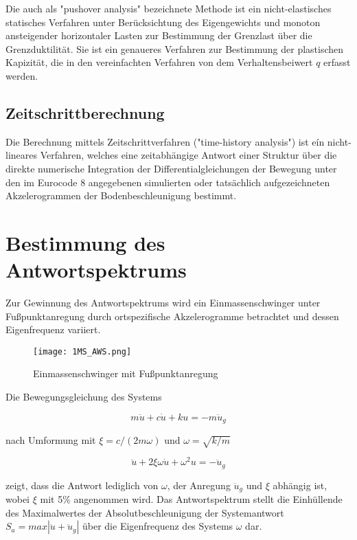 Die auch als "pushover analysis" bezeichnete Methode ist ein nicht-elastisches statisches Verfahren unter Berücksichtung des Eigengewichts und monoton ansteigender horizontaler Lasten zur Bestimmung der Grenzlast über die Grenzduktilität.
Sie ist ein genaueres Verfahren zur Bestimmung der plastischen Kapizität, die in den vereinfachten Verfahren von dem Verhaltensbeiwert $q$ erfasst werden.

\subsection{Zeitschrittberechnung}
\label{sec:Zeitschrittberechnung}

Die Berechnung mittels Zeitschrittverfahren ("time-history analysis") ist eín nicht-lineares Verfahren, welches eine zeitabhängige Antwort einer Struktur über die direkte numerische Integration der Differentialgleichungen der Bewegung unter den im Eurocode 8 angegebenen simulierten oder tatsächlich aufgezeichneten Akzelerogrammen der Bodenbeschleunigung bestimmt. 

\pagebreak

\section{Bestimmung des Antwortspektrums}
\label{sec:Antwortspektren}

Zur Gewinnung des Antwortspektrums wird ein Einmassenschwinger unter Fußpunktanregung durch ortspezifische Akzelerogramme betrachtet und dessen Eigenfrequenz variiert.

\begin{figure}[H]
    \centering
    \texttt{[image: 1MS\_AWS.png]}
    \caption{Einmassenschwinger mit Fußpunktanregung}
\end{figure}

Die Bewegungsgleichung des Systems

\begin{equation} \label{ems_aws}
m \ddot u + c \dot u + k u = -m \ddot u_g
\end{equation}

nach Umformung mit $\xi = c/(2m\omega)$ und $\omega = \sqrt{k/m}$

\begin{equation} \label{ems_aws_umf}
\ddot u + 2\xi\omega \dot u + \omega^2 u = - \ddot u_g
\end{equation}

zeigt, dass die Antwort lediglich von $\omega$, der Anregung $\ddot u_g$ und $\xi$ abhängig ist, wobei $\xi$ mit 5\% angenommen wird.
Das Antwortspektrum stellt die Einhüllende des Maximalwertes der Absolutbeschleunigung der Systemantwort $S_a=max|\ddot u + \ddot u_g|$ über die Eigenfrequenz des Systems $\omega$ dar. \cite{Bachmann}

